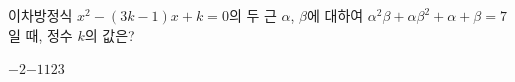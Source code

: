 이차방정식 $x^2-(3k-1)x+k=0$의 두 근 $\alpha$, $\beta$에 대하여 $\alpha^2\beta+\alpha\beta^2+\alpha+\beta=7$일 때, 정수 $k$의 값은?
\begin{choices32}{$-2$}{$-1$}{$1$}{$2$}{$3$}\end{choices32}
